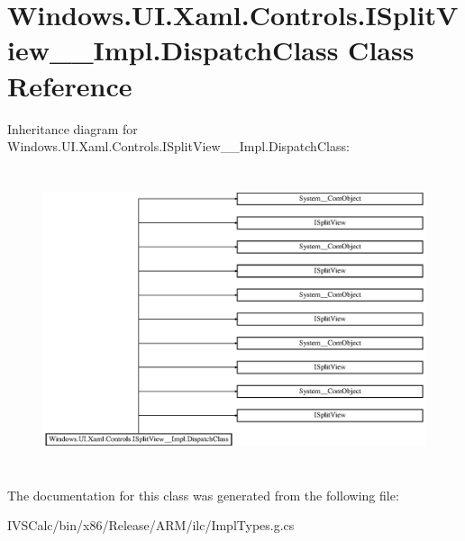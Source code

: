 \hypertarget{class_windows_1_1_u_i_1_1_xaml_1_1_controls_1_1_i_split_view_____impl_1_1_dispatch_class}{}\section{Windows.\+U\+I.\+Xaml.\+Controls.\+I\+Split\+View\+\_\+\+\_\+\+Impl.\+Dispatch\+Class Class Reference}
\label{class_windows_1_1_u_i_1_1_xaml_1_1_controls_1_1_i_split_view_____impl_1_1_dispatch_class}
Inheritance diagram for Windows.\+U\+I.\+Xaml.\+Controls.\+I\+Split\+View\+\_\+\+\_\+\+Impl.\+Dispatch\+Class\+:\begin{figure}[H]
\begin{center}
\leavevmode
\includegraphics[height=8.876081cm]{class_windows_1_1_u_i_1_1_xaml_1_1_controls_1_1_i_split_view_____impl_1_1_dispatch_class}
\end{center}
\end{figure}


The documentation for this class was generated from the following file\+:\begin{DoxyCompactItemize}
\item 
I\+V\+S\+Calc/bin/x86/\+Release/\+A\+R\+M/ilc/Impl\+Types.\+g.\+cs\end{DoxyCompactItemize}
